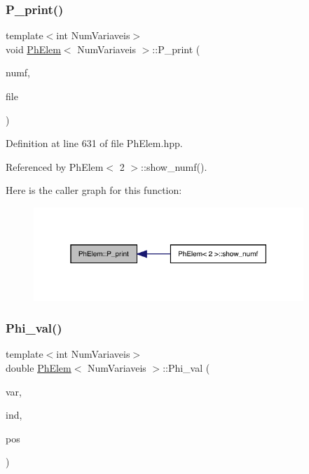 \subsubsection{\texorpdfstring{P\+\_\+print()}{P\_print()}}
{\footnotesize\ttfamily template$<$int Num\+Variaveis$>$ \\
void \hyperlink{classPhElem}{Ph\+Elem}$<$ Num\+Variaveis $>$\+::P\+\_\+print (\begin{DoxyParamCaption}\item[{const int \&}]{numf,  }\item[{F\+I\+LE $\ast$}]{file }\end{DoxyParamCaption})}



Definition at line 631 of file Ph\+Elem.\+hpp.



Referenced by Ph\+Elem$<$ 2 $>$\+::show\+\_\+numf().

Here is the caller graph for this function\+:
\nopagebreak
\begin{figure}[H]
\begin{center}
\leavevmode
\includegraphics[width=289pt]{classPhElem_a1ae41c2b94f8faca55505d25e899f724_icgraph}
\end{center}
\end{figure}
\mbox{\label{classPhElem_aa67e9fd1399ee905803999ef50581677}} 
\subsubsection{\texorpdfstring{Phi\+\_\+val()}{Phi\_val()}}
{\footnotesize\ttfamily template$<$int Num\+Variaveis$>$ \\
double \hyperlink{classPhElem}{Ph\+Elem}$<$ Num\+Variaveis $>$\+::Phi\+\_\+val (\begin{DoxyParamCaption}\item[{const int \&}]{var,  }\item[{const int \&}]{ind,  }\item[{const int \&}]{pos }\end{DoxyParamCaption})\hspace{0.3cm}{\ttfamily [inline]}}



